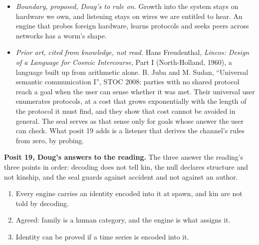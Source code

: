 \begin{itemize}
\item \emph{Boundary, proposed, Doug's to rule on.} Growth into the system stays on hardware we own, and listening stays on wires we are entitled to hear. An engine that probes foreign hardware, learns protocols and seeks peers across networks has a worm's shape.
\item \emph{Prior art, cited from knowledge, not read.} Hans Freudenthal, \emph{Lincos: Design of a Language for Cosmic Intercourse}, Part I (North-Holland, 1960), a language built up from arithmetic alone. B. Juba and M. Sudan, “Universal semantic communication I”, STOC 2008: parties with no shared protocol reach a goal when the user can sense whether it was met. Their universal user enumerates protocols, at a cost that grows exponentially with the length of the protocol it must find, and they show that cost cannot be avoided in general. The seal serves as that sense only for goals whose answer the user can check. What posit 19 adds is a listener that derives the channel's rules from zero, by probing.
\end{itemize}

\textbf{Posit 19, Doug's answers to the reading.} The three answer the reading's three points in order: decoding does not tell kin, the null declares structure and not kinship, and the seal guards against accident and not against an author.

\begin{enumerate}
\item Every engine carries an identity encoded into it at spawn, and kin are not told by decoding.
\item Agreed: family is a human category, and the engine is what assigns it.
\item Identity can be proved if a time series is encoded into it.
\end{enumerate}

